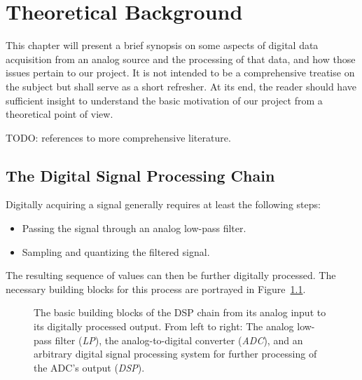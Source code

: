 \chapter{Theoretical Background} %
\label{ch:analog-to-digital_data_aquisition}

This chapter  will present a  brief synopsis on  some aspects of  digital data
acquisition from  an analog source  and the processing  of that data,  and how
those issues pertain to our project. It  is not intended to be a comprehensive
treatise on the subject but shall serve  as a short refresher. At its end, the
reader should  have sufficient insight  to understand the basic  motivation of
our project from a theoretical point of view.

TODO: references to more comprehensive literature.

\section{The Digital Signal Processing Chain}%
\label{sec:dsp_chain}

Digitally acquiring a signal generally requires at least the following steps:
\begin{itemize}\tightlist
        \item
            Passing the signal through an analog low-pass filter.
        \item
            Sampling and quantizing the filtered signal.
\end{itemize}

The   resulting   sequence  of   values   can   then  be   further   digitally
processed. The necessary  building blocks  for this  process are  portrayed in
Figure~\ref{fig:dspChain:blocks}.

\begin{figure}
    \centering
    
    \caption[The DSP Chain]{%
        The basic  building blocks of the  DSP chain from its  analog input to
        its digitally processed output.\protect\newline
        From  left  to  right: The  analog low-pass  filter  (\emph{LP}),  the
        analog-to-digital  converter (\emph{ADC}),  and  an arbitrary  digital
        signal processing  system for further  processing of the  ADC's output
        (\emph{DSP}).%
    }
    \label{fig:dspChain:blocks}
\end{figure}

